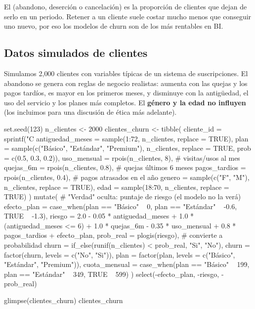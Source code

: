 El  (abandono, deserción o cancelación) es la proporción de
clientes que dejan de serlo en un periodo. Retener a un cliente suele costar
mucho menos que conseguir uno nuevo, por eso los modelos de churn son de los
más rentables en BI.

\subsection{Datos simulados de clientes}

Simulamos 2{,}000 clientes con variables típicas de un sistema de
suscripciones. El abandono se genera con reglas de negocio realistas: aumenta
con las quejas y los pagos tardíos, es mayor en los primeros meses, y disminuye
con la antigüedad, el uso del servicio y los planes más completos. El
\textbf{género y la edad no influyen} (los incluimos para una discusión de
ética más adelante).

\begin{rcode}
set.seed(123)
n_clientes <- 2000
clientes_churn <- tibble(
  cliente_id       = sprintf("C%
  antiguedad_meses = sample(1:72, n_clientes, replace = TRUE),
  plan             = sample(c("Básico", "Estándar", "Premium"),
                            n_clientes, replace = TRUE,
                            prob = c(0.5, 0.3, 0.2)),
  uso_mensual      = rpois(n_clientes, 8),    # visitas/usos al mes
  quejas_6m        = rpois(n_clientes, 0.8),  # quejas últimos 6 meses
  pagos_tardios    = rpois(n_clientes, 0.4),  # pagos atrasados en el año
  genero           = sample(c("F", "M"), n_clientes, replace = TRUE),
  edad             = sample(18:70, n_clientes, replace = TRUE)
) %
  mutate(
    # "Verdad" oculta: puntaje de riesgo (el modelo no la verá)
    efecto_plan = case_when(plan == "Básico"   ~ 0,
                            plan == "Estándar" ~ -0.6,
                            TRUE               ~ -1.3),
    riesgo = 2.0 - 0.05 * antiguedad_meses +
      1.0 * (antiguedad_meses <= 6) + 1.0 * quejas_6m -
      0.35 * uso_mensual + 0.8 * pagos_tardios + efecto_plan,
    prob_real = plogis(riesgo),               # convierte a probabilidad
    churn = if_else(runif(n_clientes) < prob_real, "Si", "No"),
    churn = factor(churn, levels = c("No", "Si")),
    plan  = factor(plan, levels = c("Básico", "Estándar", "Premium")),
    cuota_mensual = case_when(plan == "Básico"   ~ 199,
                              plan == "Estándar" ~ 349,
                              TRUE               ~ 599)
  ) %
  select(-efecto_plan, -riesgo, -prob_real)

glimpse(clientes_churn)
clientes_churn %
\end{rcode}

